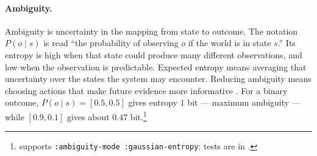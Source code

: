\paragraph{Ambiguity.} Ambiguity is uncertainty in the mapping from state to outcome.  The notation $P(o\mid s)$ is read ``the probability of observing $o$ if the world is in state $s$.''  Its entropy is high when that state could produce many different observations, and low when the observation is predictable.  Expected entropy means averaging that uncertainty over the states the system may encounter.  Reducing ambiguity means choosing actions that make future evidence more informative \cite{FRISTON2016862}.  For a binary outcome, $P(o\mid s)=[0.5,0.5]$ gives entropy $1$ bit --- maximum ambiguity --- while $[0.9,0.1]$ gives about $0.47$ bit.\footnote{ supports \texttt{:ambiguity-mode :gaussian-entropy}; tests are in .}

